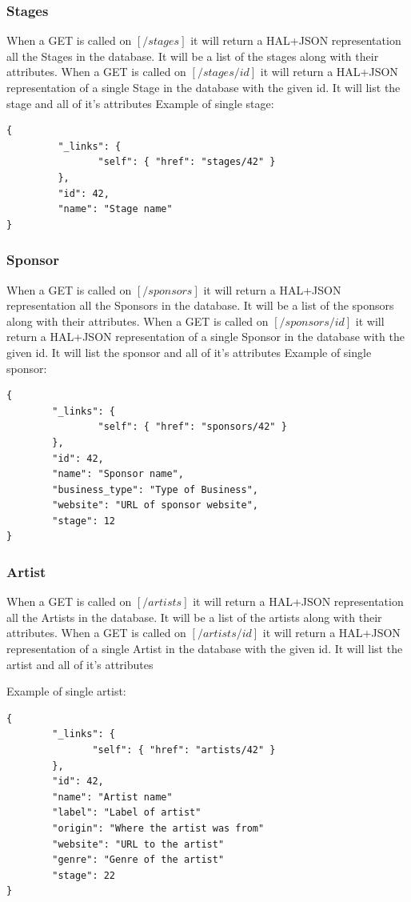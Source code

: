 \documentclass[12pt,english]{scrartcl}
\begin{document}
\subsubsection{Stages}
When a GET is called on $[/stages]$ it will return a HAL+JSON representation all the Stages in the database.  It will be a list of the stages along with their attributes.
When a GET is called on $[/stages/{id}]$ it will return a HAL+JSON representation of a single Stage in the database with the given id.  It will list the stage and all of it's attributes
Example of single stage:
\begin{verbatim}
{
         "_links": {
                "self": { "href": "stages/42" }
         },
         "id": 42,
         "name": "Stage name"
}
\end{verbatim}
\subsubsection{Sponsor}
When a GET is called on $[/sponsors]$ it will return a HAL+JSON representation all the Sponsors in the database.  It will be a list of the sponsors along with their attributes.
When a GET is called on $[/sponsors/{id}]$ it will return a HAL+JSON representation of a single Sponsor in the database with the given id.  It will list the sponsor and all of it's attributes
Example of single sponsor:
\begin{verbatim}
{
        "_links": {
                "self": { "href": "sponsors/42" }
        },
        "id": 42,
        "name": "Sponsor name",
        "business_type": "Type of Business",
        "website": "URL of sponsor website",
        "stage": 12
}
\end{verbatim}

\subsubsection{Artist}
When a GET is called on $[/artists]$ it will return a HAL+JSON representation all the Artists in the database.  It will be a list of the artists along with their attributes.
When a GET is called on $[/artists/{id}]$ it will return a HAL+JSON representation of a single Artist in the database with the given id.  It will list the artist and all of it's attributes

Example of single artist:
\begin{verbatim}
{
        "_links": {
               "self": { "href": "artists/42" }
        },
        "id": 42,
        "name": "Artist name"
        "label": "Label of artist"
        "origin": "Where the artist was from"
        "website": "URL to the artist"
        "genre": "Genre of the artist"
        "stage": 22
}
\end{verbatim}
\end{document}
